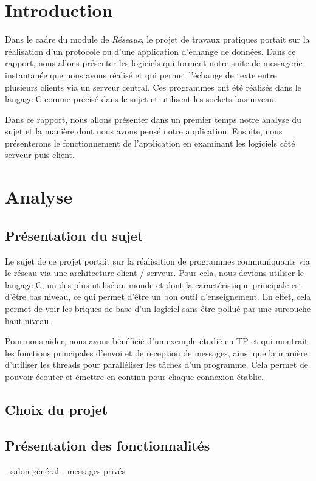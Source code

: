 \chapter*{Introduction}
	Dans le cadre du module de \emph{Réseaux}, le projet de travaux pratiques portait sur la réalisation d'un protocole ou d'une application d'échange de données. Dans ce rapport, nous allons présenter les logiciels qui forment notre suite de messagerie instantanée que nous avons réalisé et qui permet l'échange de texte entre plusieurs clients via un serveur central. Ces programmes ont été réalisés dans le langage C comme précisé dans le sujet et utilisent les sockets bas niveau.
	
	Dans ce rapport, nous allons présenter dans un premier temps notre analyse du sujet et la manière dont nous avons pensé notre application. Ensuite, nous présenterons le fonctionnement de l'application en examinant les logiciels côté serveur puis client. 
		
\chapter{Analyse}
	\section{Présentation du sujet}
		Le sujet de ce projet portait sur la réalisation de programmes communiquants via le réseau via une architecture client / serveur.  Pour cela, nous devions utiliser le langage C, un des plus utilisé au monde et dont la caractéristique principale est d'être bas niveau, ce qui permet d'être un bon outil d'enseignement. En effet, cela permet de voir les briques de base d'un logiciel sans être pollué par une surcouche haut niveau.
		
		Pour nous aider, nous avons bénéficié d'un exemple étudié en TP et qui montrait les fonctions principales d'envoi et de reception de messages, ainsi que la manière d'utiliser les threads pour paralléliser les tâches d'un programme. Cela permet de pouvoir écouter et émettre en continu pour chaque connexion établie.

	\section{Choix du projet}
		

	\section{Présentation des fonctionnalités}
		- salon général
		- messages privés
		

